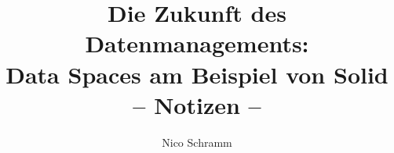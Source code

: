 
\title{\textbf{Die Zukunft des Datenmanagements:\\
       Data Spaces am Beispiel von Solid}\\
       \Large-- Notizen --}
\author{Nico Schramm}

\newcommand{\subject}{Handout zum Oberseminar-Vortrag}
